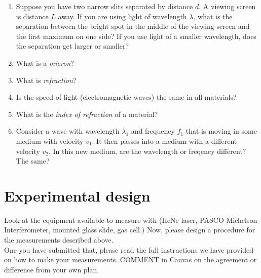 \documentclass{tufte-handout}
\begin{document}
\begin{enumerate}
\item Suppose you have two narrow slits separated by distance $d$. A viewing screen is distance $L$ away. If you are
using light of wavelength $\lambda$, what is the separation between the bright spot in the middle of
the viewing screen and the first maximum on one side? If you use light of a smaller wavelength, does
the separation get larger or smaller?

\item What is a {\it micron}?

\item What is {\it refraction}?

\item Is the speed of light (electromagnetic waves) the same in all materials?

\item What is the {\it index of refraction} of a material?

\item Consider a wave with wavelength $\lambda_1$ and frequency $f_1$ that is moving in some medium
with velocity $v_1$. It then passes into a medium with a different velocity $v_2$. In this new
medium, are the wavelength or freqency different? The same?

\end{enumerate}

\section{Experimental design}

Look at the equipment available to measure with (HeNe laser, PASCO Michelson Interferometer, mounted glass slide, gas cell.)
Now, please design a procedure for the measurements described above.\\

One you have submitted that, please read the full instructions we have provided on how to make your measurements.  COMMENT in Canvas on the agreement or difference from your own plan.
\end{document}
